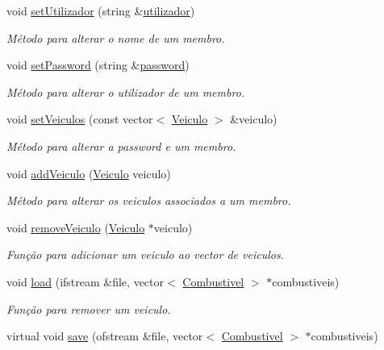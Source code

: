 \begin{DoxyCompactItemize}
void \hyperlink{class_membro_ac0ce078ab4d7d5a72e370ea6335e8eef}{set\+Utilizador} (string \&\hyperlink{class_membro_a42cc733ff94ec8d1bbfdacc62dfbb0e7}{utilizador})
\begin{DoxyCompactList}\small\item\em Método para alterar o nome de um membro. \end{DoxyCompactList}\item 
void \hyperlink{class_membro_ab5a7b1734090d146bb39f8cfa52be006}{set\+Password} (string \&\hyperlink{class_membro_ae2b12fc3e91efc674c07e735edf4ac21}{password})
\begin{DoxyCompactList}\small\item\em Método para alterar o utilizador de um membro. \end{DoxyCompactList}\item 
void \hyperlink{class_membro_ab40d72d229c4147372bd747d66176f55}{set\+Veiculos} (const vector$<$ \hyperlink{class_veiculo}{Veiculo} $>$ \&veiculo)
\begin{DoxyCompactList}\small\item\em Método para alterar a password e um membro. \end{DoxyCompactList}\item 
void \hyperlink{class_membro_a5b553a2050694926ea081585dc041c8a}{add\+Veiculo} (\hyperlink{class_veiculo}{Veiculo} veiculo)
\begin{DoxyCompactList}\small\item\em Método para alterar os veiculos associados a um membro. \end{DoxyCompactList}\item 
void \hyperlink{class_membro_a9d1b070ef532a6357ecbd0bb52a2be0a}{remove\+Veiculo} (\hyperlink{class_veiculo}{Veiculo} $\ast$veiculo)
\begin{DoxyCompactList}\small\item\em Função para adicionar um veiculo ao vector de veiculos. \end{DoxyCompactList}\item 
void \hyperlink{class_membro_a3f6fcbde8bb6e631101e838e07240126}{load} (ifstream \&file, vector$<$ \hyperlink{class_combustivel}{Combustivel} $>$ $\ast$combustiveis)
\begin{DoxyCompactList}\small\item\em Função para remover um veiculo. \end{DoxyCompactList}\item 
virtual void \hyperlink{class_membro_a2a8ceaddac1fb7b0f894b1adc9315f03}{save} (ofstream \&file, vector$<$ \hyperlink{class_combustivel}{Combustivel} $>$ $\ast$combustiveis)

\end{DoxyCompactItemize}
